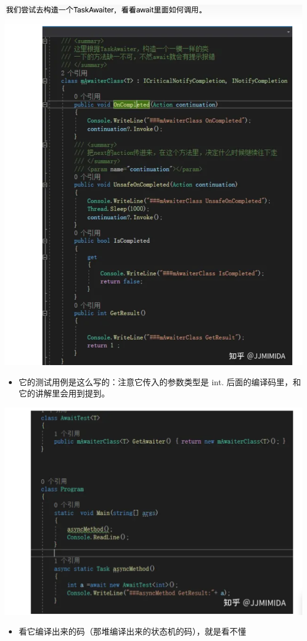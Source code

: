 \documentclass[9pt, b5paper]{article}
\begin{document}
\includegraphics[width=.9\linewidth]{./pic/et3_20230609_105627.png}
\begin{itemize}
\item 它的测试用例是这么写的：注意它传入的参数类型是 int. 后面的编译码里，和它的讲解里会用到提到。
\end{itemize}

\includegraphics[width=.9\linewidth]{./pic/et3_20230609_105927.png}
\begin{itemize}
\item 看它编译出来的码（那堆编译出来的状态机的码），就是看不懂
\end{itemize}
\end{document}
